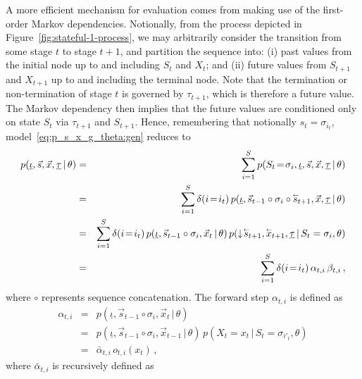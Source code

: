 \documentclass[a4paper]{article}
\newcommand{\rvec}[1]{\accentset{\leftarrow}{#1}}
\newcommand{\dn}{\downarrow\!}
\begin{document}
A more efficient mechanism for evaluation comes from making use of the first-order Markov dependencies.
Notionally, from the process depicted in Figure~\ref{fig:stateful-1-process}, we may arbitrarily consider the transition from 
some stage $t$ to stage $t+1$,
and partition the sequence into: (i) past values from the initial node up to and including $S_t$ and $X_t$;
and (ii) future values from $S_{t+1}$ and $X_{t+1}$ up to and including the terminal node.
Note that the termination or non-termination of stage $t$ is governed by $\tau_{t+1}$, which is
therefore a future value.
The Markov dependency then implies that the future values are conditioned only on state $S_t$
via $\tau_{t+1}$ and $S_{t+1}$.
Hence, remembering that notionally $s_t=\sigma_{i_t}$, model~\eqref{eq:p_s_x_g_theta:gen} reduces to
\begin{eqnarray}
   p(\underline{\iota},\vec{s},\vec{x},\underline{\tau}\,|\,\theta) 
& = &
   \sum_{i=1}^{S}p(S_t\!=\!\sigma_{i},\underline{\iota},\vec{s},\vec{x},\underline{\tau}\,|\,\theta) 
\nonumber\\& = & 
   \sum_{i=1}^{S}\delta(i\!=\!i_t)\,p(\underline{\iota},\vec{s}_{t-1}\circ\sigma_{i}\circ\rvec{s}_{t+1},\vec{x},\underline{\tau}\,|\,\theta) 
\nonumber\\& = & 
   \sum_{i=1}^{S}\delta(i\!=\!i_t)\,p(\underline{\iota},\vec{s}_{t-1}\circ\sigma_{i},\vec{x}_t\,|\,\theta) 
\,p(\dn\rvec{s}_{t+1},\rvec{x}_{t+1},\underline{\tau}\,|\,S_t=\sigma_{i},\theta) 
\nonumber\\& = &
  \sum_{i=1}^{S}\delta(i\!=\!i_t)\,\alpha_{t,i}\,\beta_{t,i}\,,
\label{eq:forward-backward}
\end{eqnarray}
where $\circ$ represents sequence concatenation.
The forward step $\alpha_{t,i}$ is defined as
\begin{eqnarray}
   \alpha_{t,i} & = & p(\underline{\iota},\vec{s}_{t-1}\circ\sigma_{i},\vec{x}_t\,|\,\theta) 
\nonumber\\& = &
   p(\underline{\iota},\vec{s}_{t-1}\circ\sigma_{i},\vec{x}_{t-1}\,|\,\theta) \,p(X_t\!=\!x_t\,|\,S_t\!=\!\sigma_{i'_t},\theta)
\nonumber\\& = &
   \bar{\alpha}_{t,i}\,o_{t,i}(x_t)\,,
\label{eq:alpha}
\end{eqnarray}
where $\bar{\alpha}_{t,i}$ is recursively defined as
\end{document}
